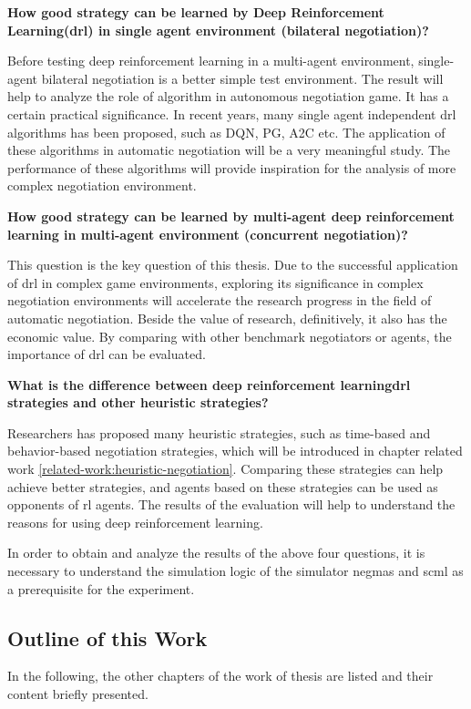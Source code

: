 \textbf{How good strategy can be learned by Deep Reinforcement Learning(\gls{drl}) in single agent environment (bilateral negotiation)?}

Before testing deep reinforcement learning in a multi-agent environment, single-agent bilateral negotiation is a better simple test environment. The result will help to analyze the role of algorithm in autonomous negotiation game. It has a certain practical significance. In recent years, many single agent independent \gls{drl} algorithms has been proposed, such as DQN, PG, A2C etc. The application of these algorithms in automatic negotiation will be a very meaningful study. The performance of these algorithms will provide inspiration for the analysis of more complex negotiation environment.

\textbf{How good strategy can be learned by multi-agent deep reinforcement learning in multi-agent environment (concurrent negotiation)?}

This question is the key question of this thesis. Due to the successful application of \gls{drl} in complex game environments, exploring its significance in complex negotiation environments will accelerate the research progress in the field of automatic negotiation. Beside the value of research, definitively, it also has the economic value. By comparing with other benchmark negotiators or agents, the importance of \gls{drl} can be evaluated.

\textbf{What is the difference between deep reinforcement learning\gls{drl} strategies and other heuristic strategies?}

Researchers has proposed many heuristic strategies, such as time-based and behavior-based negotiation strategies, which will be introduced in chapter related work \ref{related-work:heuristic-negotiation}. Comparing these strategies can help achieve better strategies, and agents based on these strategies can be used as opponents of \gls{rl} agents. The results of the evaluation will help to understand the reasons for using deep reinforcement learning.

In order to obtain and analyze the results of the above four questions, it is necessary to understand the simulation logic of the simulator \gls{negmas} and \gls{scml} as a prerequisite for the experiment.

\subsection{Outline of this Work}
In the following, the other chapters of the work of thesis are listed and their content briefly presented.

